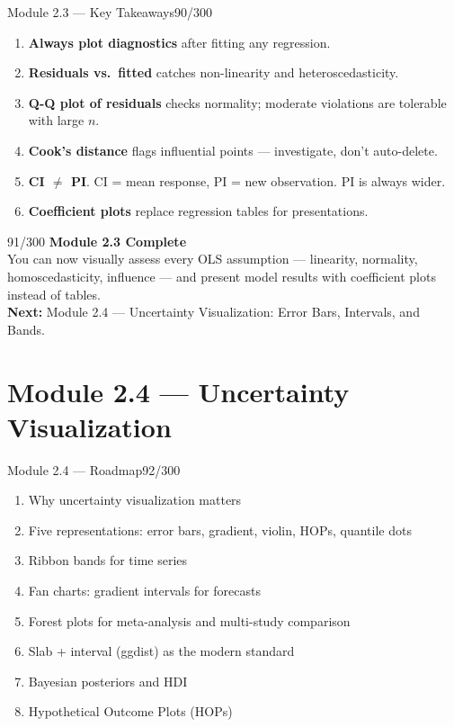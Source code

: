 \documentclass[10pt]{beamer}
\newcommand{\smark}[1]{\hfill{\scriptsize\color{codegray}#1}}
\begin{document}
\begin{frame}{Module 2.3 --- Key Takeaways}\smark{90/300}
\begin{enumerate}
    \item \textbf{Always plot diagnostics} after fitting any regression.
    \item \textbf{Residuals vs.\ fitted} catches non-linearity and heteroscedasticity.
    \item \textbf{Q-Q plot of residuals} checks normality; moderate violations are tolerable with large $n$.
    \item \textbf{Cook's distance} flags influential points --- investigate, don't auto-delete.
    \item \textbf{CI $\neq$ PI}. CI = mean response, PI = new observation. PI is always wider.
    \item \textbf{Coefficient plots} replace regression tables for presentations.
\end{enumerate}
\end{frame}

\begin{frame}{}\smark{91/300}
\centering\vspace{1.5cm}
{\Large\textbf{Module 2.3 Complete}}\\[0.5cm]
You can now visually assess every OLS assumption --- linearity, normality, homoscedasticity, influence --- and present model results with coefficient plots instead of tables.\\[0.5cm]
\textbf{Next:} Module 2.4 --- Uncertainty Visualization: Error Bars, Intervals, and Bands.
\end{frame}

\section{Module 2.4 --- Uncertainty Visualization}

\begin{frame}{Module 2.4 --- Roadmap}\smark{92/300}
\begin{enumerate}
    \item Why uncertainty visualization matters
    \item Five representations: error bars, gradient, violin, HOPs, quantile dots
    \item Ribbon bands for time series
    \item Fan charts: gradient intervals for forecasts
    \item Forest plots for meta-analysis and multi-study comparison
    \item Slab + interval (ggdist) as the modern standard
    \item Bayesian posteriors and HDI
    \item Hypothetical Outcome Plots (HOPs)
\end{enumerate}
\end{frame}
\end{document}
